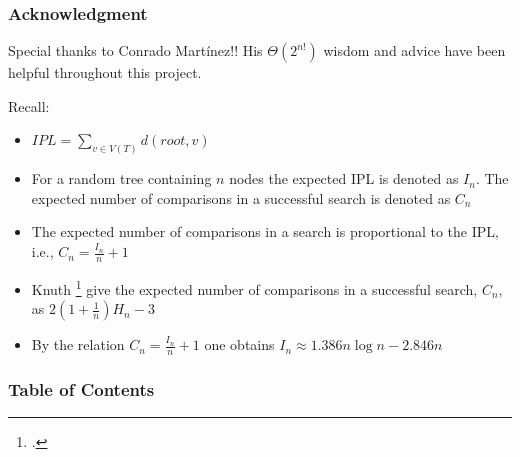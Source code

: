 \documentclass{beamer}
\begin{document}
\frame{\titlepage}

\begin{frame}
\frametitle{Acknowledgment}
Special thanks to Conrado Martínez!!
His $\Theta(2^{n!})$ wisdom and advice  have been helpful throughout this project.
\end{frame}

\begin{frame}
    Recall:
    \begin{itemize}
        \item $IPL = \sum\limits_{v \in V(T)} d(root, v)$
            \pause
        \item For a random tree containing $n$ nodes the expected IPL is denoted as $I_n$. The expected number of comparisons in a successful search is denoted as $C_n$ 
        \item The expected number of comparisons in a search is proportional to the IPL, i.e., $C_n = \frac{I_n}{n} + 1$
            \pause
        \item Knuth \footcite{knuth1998art} give the expected number of comparisons in a successful search, $C_n$, as $2(1 + \frac{1}{n})H_n - 3$
        \item By the relation $C_n = \frac{I_n}{n} + 1$ one obtains $I_n \approx 1.386n \log n - 2.846n$
    \end{itemize}
\end{frame}

\begin{frame}
    \frametitle{Table of Contents}
    \tableofcontents
\end{frame}
\end{document}
